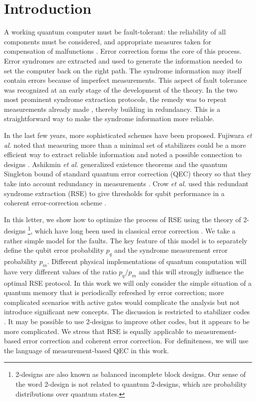 \documentclass[reprint, superscriptaddress]{revtex4-1}
\numberwithin{equation}{section}
\numberwithin{figure}{section}
\numberwithin{table}{section}
\begin{document}
\section{Introduction}
A working quantum computer must be fault-tolerant: the reliability of all components must be considered, and appropriate measures taken for compensation of malfunctions \cite{Shor1996, Preskill1999}.  Error correction forms the core of this process.  Error syndromes are extracted and used to generate the information needed to set the computer back on the right path.
The syndrome information may itself contain errors because of imperfect measurements.  This aspect of fault tolerance was recognized at an early stage of the development of the theory. In the two most prominent syndrome extraction protocols, the remedy was to repeat measurements already made \cite{Steane1996, Divincenzo1996}, thereby building in redundancy.  This is a straightforward way to make the syndrome information more reliable.

In the last few years, more sophisticated schemes have been proposed.  Fujiwara \textit{et al.} noted that measuring more than a minimal set of stabilizers could be a more efficient way to extract reliable information and noted a possible connection to designs \cite{Fujiwara2014, Fujiwara2015}.  Ashikmin \textit{et al.}   generalized existence theorems and the quantum Singleton bound of standard quantum error correction (QEC) theory so that they take into account redundancy in measurements \cite{Ashikhmin2014}.  Crow \textit{et al.}  used this redundant syndrome extraction (RSE) to give thresholds for qubit performance in a coherent error-correction scheme \cite{Crow2016}.  

In this letter, we show how to optimize the process of RSE using the theory of 2-designs \footnote{  2-designs are also known as balanced incomplete block designs.  Our sense of the word 2-design is not related to quantum 2-designs, which are probability distributions over quantum states.}, which have long been used in classical error correction \cite{pless}.  We take a rather simple model for the faults.  The key feature of this model is to separately define the qubit error probability $p_q$ and the syndrome measurement error probability $p_m$.  Different physical implementations of quantum computation will have very different values of the ratio $p_q/p_m$ and this will strongly influence the optimal RSE protocol.  In this work we will only consider the simple situation of a quantum memory that is periodically refreshed by error correction; more complicated scenarios with active gates would complicate the analysis but not introduce significant new concepts.  The discussion is restricted to stabilizer codes \cite{Gottesman1996}.  It may be possible to use 2-designs to improve other codes, but it appears to be more complicated.  We stress that RSE is equally applicable to measurement-based error correction and coherent error correction.  For definiteness, we will use the language of measurement-based QEC in this work. 
\end{document}
